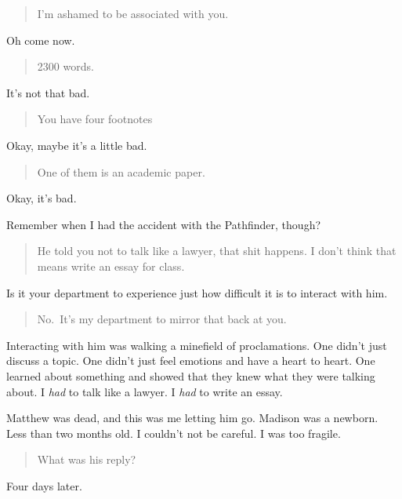 \begin{quote}
I'm ashamed to be associated with you.
\end{quote}

Oh come now.

\begin{quote}
2300 words.
\end{quote}

It's not that bad.

\begin{quote}
You have four footnotes
\end{quote}

Okay, maybe it's a little bad.

\begin{quote}
One of them is an academic paper.
\end{quote}

Okay, it's bad.

Remember when I had the accident with the Pathfinder, though?

\begin{quote}
He told you not to talk like a lawyer, that shit happens. I don't think that means write an essay for class.
\end{quote}

Is it your department to experience just how difficult it is to interact with him.

\begin{quote}
No.~It's my department to mirror that back at you.
\end{quote}

Interacting with him was walking a minefield of proclamations. One didn't just discuss a topic. One didn't just feel emotions and have a heart to heart. One learned about something and showed that they knew what they were talking about. I \emph{had} to talk like a lawyer. I \emph{had} to write an essay.

Matthew was dead, and this was me letting him go. Madison was a newborn. Less than two months old. I couldn't not be careful. I was too fragile.

\begin{quote}
What was his reply?
\end{quote}

Four days later.


